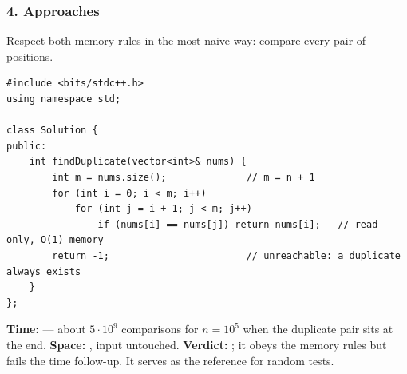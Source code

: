 \subsubsection*{4. Approaches}

\begin{bruteforcebox}
Respect both memory rules in the most naive way: compare every pair of positions.

\begin{lstlisting}[style=cpp]
#include <bits/stdc++.h>
using namespace std;

class Solution {
public:
    int findDuplicate(vector<int>& nums) {
        int m = nums.size();              // m = n + 1
        for (int i = 0; i < m; i++)
            for (int j = i + 1; j < m; j++)
                if (nums[i] == nums[j]) return nums[i];   // read-only, O(1) memory
        return -1;                        // unreachable: a duplicate always exists
    }
};
\end{lstlisting}

\begin{complexitybox}
\textbf{Time:}  --- about $5\cdot10^9$ comparisons for $n = 10^5$ when the duplicate pair sits at the end. \textbf{Space:} , input untouched. \textbf{Verdict:} \tle{}; it obeys the memory rules but fails the time follow-up. It serves as the reference for random tests.
\end{complexitybox}
\end{bruteforcebox}

